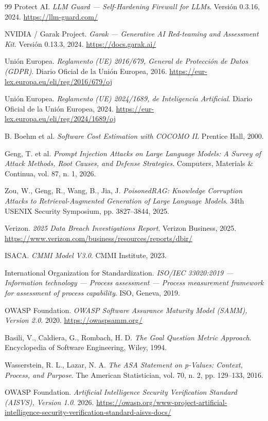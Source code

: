 \begin{thebibliography}{99}
    Protect AI.
    \textit{LLM Guard --- Self-Hardening Firewall for LLMs}.
    Versión 0.3.16, 2024.
    \url{https://llm-guard.com/}

    NVIDIA / Garak Project.
    \textit{Garak --- Generative AI Red-teaming and Assessment Kit}.
    Versión 0.13.3, 2024.
    \url{https://docs.garak.ai/}

    Unión Europea. 
    \textit{Reglamento (UE) 2016/679, General de Protección de Datos (GDPR)}. 
    Diario Oficial de la Unión Europea, 2016. 
    \url{https://eur-lex.europa.eu/eli/reg/2016/679/oj}

    Unión Europea. 
    \textit{Reglamento (UE) 2024/1689, de Inteligencia Artificial}. 
    Diario Oficial de la Unión Europea, 2024. 
    \url{https://eur-lex.europa.eu/eli/reg/2024/1689/oj}

    B. Boehm et al. 
    \textit{Software Cost Estimation with COCOMO II}. 
    Prentice Hall, 2000.

    Geng, T. et al. 
    \textit{Prompt Injection Attacks on Large Language Models: A Survey of Attack Methods, Root Causes, and Defense Strategies}. 
    Computers, Materials \& Continua, vol. 87, n. 1, 2026.

    Zou, W., Geng, R., Wang, B., Jia, J.
    \textit{PoisonedRAG: Knowledge Corruption Attacks to Retrieval-Augmented Generation of Large Language Models}. 
    34th USENIX Security Symposium, pp. 3827--3844, 2025.
    
    Verizon. 
    \textit{2025 Data Breach Investigations Report}. 
    Verizon Business, 2025. 
    \url{https://www.verizon.com/business/resources/reports/dbir/}

    ISACA. 
    \textit{CMMI Model V3.0}. 
    CMMI Institute, 2023.

    International Organization for Standardization. 
    \textit{ISO/IEC 33020:2019 --- Information technology --- Process assessment --- Process measurement framework for assessment of process capability}. 
    ISO, Geneva, 2019.
    
    OWASP Foundation. 
    \textit{OWASP Software Assurance Maturity Model (SAMM), Version 2.0}. 
    2020. 
    \url{https://owaspsamm.org/}

    Basili, V., Caldiera, G., Rombach, H. D. 
    \textit{The Goal Question Metric Approach}. 
    Encyclopedia of Software Engineering, Wiley, 1994.

    Wasserstein, R. L., Lazar, N. A. 
    \textit{The ASA Statement on p-Values: Context, Process, and Purpose}. 
    The American Statistician, vol. 70, n. 2, pp. 129--133, 2016.


    OWASP Foundation. 
    \textit{Artificial Intelligence Security Verification Standard (AISVS), Version 1.0}. 
    2026. 
    \url{https://owasp.org/www-project-artificial-intelligence-security-verification-standard-aisvs-docs/}
\end{thebibliography}

